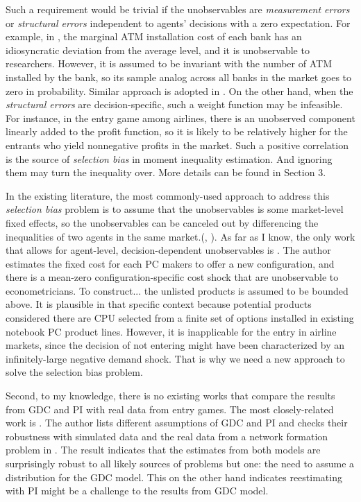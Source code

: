 \documentclass[draft]{article}
\begin{document}
Such a requirement would be trivial if the unobservables are \textit{measurement errors} or {\color{red} \textit{structural errors} independent} to agents' decisions with a zero expectation. For example, in \cite{ishii2008compatibility}, the marginal ATM installation cost of each bank has an idiosyncratic deviation from the average level, and it is unobservable to researchers. However, it is assumed to be invariant with the number of ATM installed by the bank, so its sample analog across all banks in the market goes to zero in probability. Similar approach is adopted in \cite{ho2009insurer}. On the other hand, when the \textit{structural errors} are decision-specific, such a weight function may be infeasible. For instance, in the entry game among airlines, there is an unobserved component linearly added to the profit function, so it is likely to be relatively higher for the entrants who yield nonnegative profits in the market. Such a positive correlation is the source of \textit{selection bias} in moment inequality estimation. And ignoring them may turn the inequality over. More details can be found in Section 3.


In the existing literature, the most commonly-used approach to address this \textit{selection bias} problem is to assume that the unobservables is some market-level fixed effects, so the unobservables can be canceled out by differencing the inequalities of two agents in the same market.(\cite{ellickson2013estimating}, \cite{ho2014hospital}). As far as I know, the only work that allows for agent-level, decision-dependent unobservables is \cite{eizenberg2014upstream}. The author estimates the fixed cost for each PC makers to offer a new configuration, and there is a mean-zero configuration-specific cost shock that are unobservable to econometricians. {\color{red}To construct...} the unlisted products is assumed to be bounded above. It is plausible in that specific context because potential products considered there are CPU selected from a finite set of options installed in existing notebook PC product lines. However, it is inapplicable for the entry in airline markets, since the decision of not entering might have been characterized by an infinitely-large negative demand shock. That is why we need a new approach to solve the selection bias problem.

Second, to my knowledge, there is no existing works that compare the results from GDC and PI with real data from entry games. The most closely-related work is \cite{pakes2010alternative}. The author lists different assumptions of GDC and PI and checks their robustness with simulated data and the real data from a network formation problem in  \cite{ho2009insurer}. The result indicates that the estimates from both models are surprisingly robust to all likely sources of problems but one: the need to assume a distribution for the GDC model. This on the other hand indicates reestimating \cite{ciliberto2009market} with PI might be a challenge to the results from GDC model.
\end{document}
